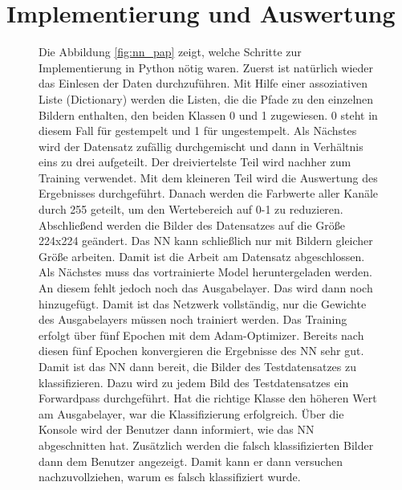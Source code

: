 \documentclass[12pt,toc=bib,toc=listof]{scrreprt}
\begin{document}
\section{Implementierung und Auswertung}
\label{sec_nn:impl}

\begin{figure}[h]
\begin{minipage}[t]{.71\linewidth}

Die Abbildung \ref{fig:nn_pap} zeigt, welche Schritte zur Implementierung in Python nötig waren. Zuerst ist natürlich wieder das Einlesen der Daten durchzuführen. Mit Hilfe einer assoziativen Liste (Dictionary) werden die Listen, die die Pfade zu den einzelnen Bildern enthalten, den beiden Klassen 0 und 1 zugewiesen. 0 steht in diesem Fall für gestempelt und 1 für ungestempelt. Als Nächstes wird der Datensatz zufällig durchgemischt und dann in Verhältnis eins zu drei aufgeteilt. Der dreiviertelste Teil wird nachher zum Training verwendet. Mit dem kleineren Teil wird die Auswertung des Ergebnisses durchgeführt. Danach werden die Farbwerte aller Kanäle durch 255 geteilt, um den Wertebereich auf 0-1 zu reduzieren. Abschließend werden die Bilder des Datensatzes auf die Größe 224x224 geändert. Das NN kann schließlich nur mit Bildern gleicher Größe arbeiten. Damit ist die Arbeit am Datensatz abgeschlossen. Als Nächstes muss das vortrainierte Model heruntergeladen werden. An diesem fehlt jedoch noch das Ausgabelayer. Das wird dann noch hinzugefügt. Damit ist das Netzwerk vollständig, nur die Gewichte des Ausgabelayers müssen noch trainiert werden. Das Training erfolgt über fünf Epochen mit dem Adam-Optimizer. Bereits nach diesen fünf Epochen konvergieren die Ergebnisse des NN sehr gut. Damit ist das NN dann bereit, die Bilder des Testdatensatzes zu klassifizieren. Dazu wird zu jedem Bild des Testdatensatzes ein Forwardpass durchgeführt. Hat die richtige Klasse den höheren Wert am Ausgabelayer, war die Klassifizierung erfolgreich. Über die Konsole wird der Benutzer dann informiert, wie das NN abgeschnitten hat. Zusätzlich werden die falsch klassifizierten Bilder dann dem Benutzer angezeigt. Damit kann er dann versuchen nachzuvollziehen, warum es falsch klassifiziert wurde.
\end{minipage}
\hfill
\begin{minipage}[t]{.24\linewidth}
\strut\vspace*{-\baselineskip}
\newline

\end{minipage}
\end{figure}
\end{document}
